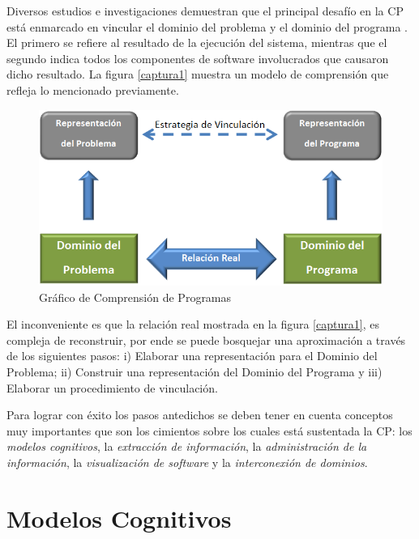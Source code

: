 \documentclass[a4paper,12pt]{report}
\begin{document}
Diversos estudios e investigaciones demuestran que el principal desafío en la CP está enmarcado en vincular el dominio del problema y el dominio del programa \cite{BRM10,MPMR07,MBPHRU10,DWE04}. El primero se refiere al resultado de la ejecución del sistema, mientras que el segundo indica todos los componentes de software involucrados que causaron dicho resultado. 
La figura \ref{captura1} muestra un modelo de comprensión que refleja lo mencionado previamente.

\begin{figure}[h] %
\centerline{%
\includegraphics[scale= 0.7]{./dom.png}
}
\caption{Gráfico de Comprensión de Programas}
\end{figure} \label{captura1}

El inconveniente es que la relación real mostrada en la figura \ref{captura1}, es compleja de reconstruir, por ende se puede bosquejar una aproximación a través de los si\-guientes pasos: i) Elaborar una representación para el Dominio del Problema; ii)
Construir una representación del Dominio del Programa y iii) Elaborar un procedimiento de vinculación.
 
Para lograr con éxito los pasos antedichos se deben tener en cuenta conceptos muy importantes que son los cimientos sobre los cuales está sustentada la CP: los \textit{modelos cognitivos}, la \textit{extracción de información}, la \textit{administración de la información}, la \textit{visualización de software} y la \textit{interconexión de dominios}.

\section{Modelos Cognitivos}
\end{document}

